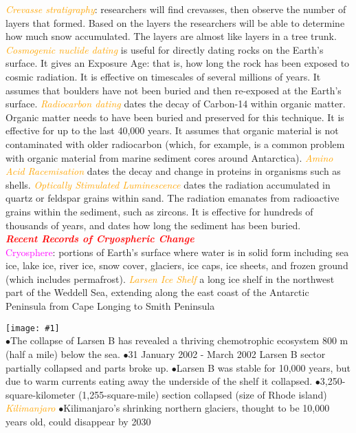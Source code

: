 \documentclass{article}
\newcommand{\ddd}{$\bullet$}
\newcommand{\red}[1]{\textcolor{red}{#1}}
\newcommand{\pink}[1]{\textcolor{magenta}{#1}}
\newcommand{\orange}[1]{\textcolor{orange}{#1}}
\newcommand{\mysection}[1]{\\ \textbf{\textit{\red{#1}}} \\}
\newcommand{\mysub}[1]{{\textit{\orange{#1}}}}
\newcommand{\vocab}[1]{{\pink{#1}}}
\newcommand{\figwidth}[2]{
	\texttt{[image: \#1]}
}
\begin{document}
\begin{multicols*}{4}
            \mysub{Crevasse stratigraphy}: researchers will find crevasses, then observe the number of layers that formed. Based on the layers the researchers will be able to determine how much snow accumulated. The layers are almost like layers in a tree trunk.
            \mysub{Cosmogenic nuclide dating} is useful for directly dating rocks on the Earth’s surface. It gives an Exposure Age: that is, how long the rock has been exposed to cosmic radiation. It is effective on timescales of several millions of years. It assumes that boulders have not been buried and then re-exposed at the Earth’s surface.
            \mysub{Radiocarbon dating} dates the decay of Carbon-14 within organic matter. Organic matter needs to have been buried and preserved for this technique. It is effective for up to the last 40,000 years. It assumes that organic material is not contaminated with older radiocarbon (which, for example, is a common problem with organic material from marine sediment cores around Antarctica).
            \mysub{Amino Acid Racemisation} dates the decay and change in proteins in organisms such as shells.
            \mysub{Optically Stimulated Luminescence} dates the radiation accumulated in quartz or feldspar grains within sand. The radiation emanates from radioactive grains within the sediment, such as zircons. It is effective for hundreds of thousands of years, and dates how long the sediment has been buried.
        \mysection{Recent Records of Cryospheric Change}
            \vocab{Cryosphere}: portions of Earth’s surface where water is in solid form including sea ice, lake ice, river ice, snow cover, glaciers, ice caps, ice sheets, and frozen ground (which includes permafrost).
            \mysub{Larsen Ice Shelf}
                a long ice shelf in the northwest part of the Weddell Sea, extending along the east coast of the Antarctic Peninsula from Cape Longing to Smith Peninsula
                \figwidth{Larsen_contours}{5} \\
                \ddd The collapse of Larsen B has revealed a thriving chemotrophic ecosystem 800 m (half a mile) below the sea.
                \ddd 31 January 2002 - March 2002 Larsen B sector partially collapsed and parts broke up. 
                \ddd Larsen B was stable for 10,000 years, but due to warm currents eating away the underside of the shelf it collapsed. 
                \ddd 3,250-square-kilometer (1,255-square-mile) section collapsed (size of Rhode island)
            \mysub{Kilimanjaro}
                \ddd Kilimanjaro's shrinking northern glaciers, thought to be 10,000 years old, could disappear by 2030

\end{multicols*}
\end{document}

